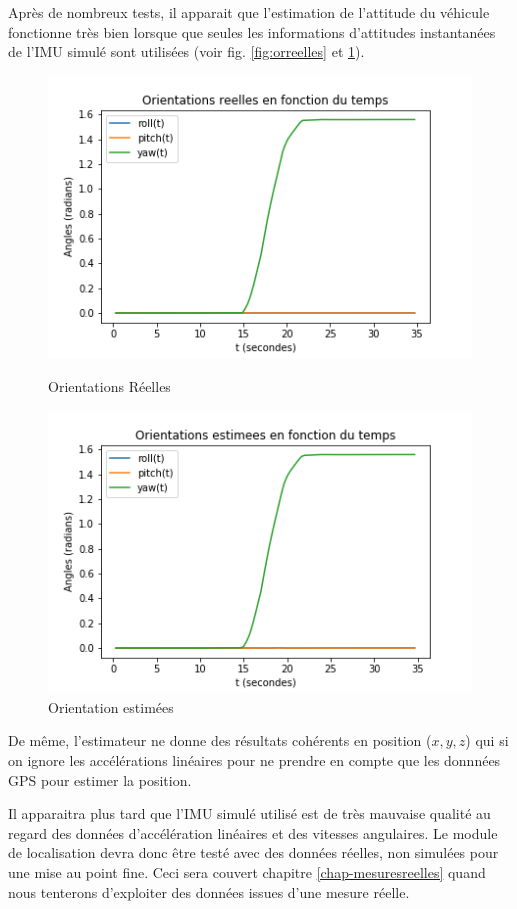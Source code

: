 \documentclass[12pt,a4paper]{report}
\begin{document}
	\para Après de nombreux tests, il apparait que l'estimation de l'attitude du véhicule fonctionne très bien lorsque que seules les informations d'attitudes instantanées de l'IMU simulé sont utilisées (voir fig. \ref{fig:orreelles} et \ref{fig:orest}).
	
	\begin{figure}[h!]
		\centering
		
		\begin{minipage}{.5\textwidth}
			\centering
			\includegraphics[width=0.7\linewidth]{img/orientations-reelles.png}
			\caption[orrelles]{Orientations Réelles}
			\label{fig:orreelles}
		\end{minipage}%
		\begin{minipage}{.5\textwidth}
			\centering
			\includegraphics[width=0.7\linewidth]{img/orientations-estimees.png}
			\caption[orest]{Orientation estimées}
			\label{fig:orest}
		\end{minipage}
	\end{figure}
	
	
	\para De même, l'estimateur ne donne des résultats cohérents en position ($x,y,z$) qui si on ignore les accélérations linéaires pour ne prendre en compte que les donnnées GPS pour estimer la position.
	
	\para Il apparaitra plus tard que l'IMU simulé utilisé est de très mauvaise qualité au regard des données d'accélération linéaires et des vitesses angulaires. Le module de localisation devra donc être testé avec des données réelles, non simulées pour une mise au point fine. Ceci sera couvert chapitre \ref{chap-mesuresreelles} quand nous tenterons d'exploiter des données issues d'une mesure réelle.
	
\end{document}
